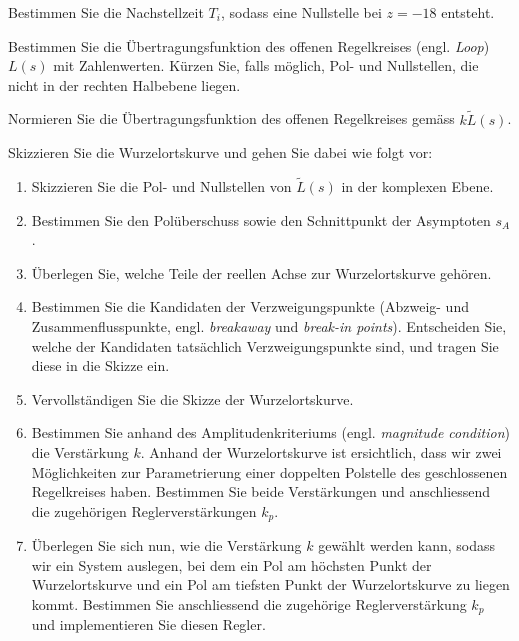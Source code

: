 \documentclass[a4paper,11pt]{scrartcl}
\begin{document}
\begin{aufgaben}
    \item Bestimmen Sie die Nachstellzeit $T_i$, sodass eine Nullstelle bei $z = -18$ entsteht.
    \item Bestimmen Sie die Übertragungsfunktion des offenen Regelkreises (engl. \emph{Loop}) $L(s)$ mit Zahlenwerten. Kürzen Sie, falls möglich, Pol- und Nullstellen, die nicht in der rechten Halbebene liegen.
    \item Normieren Sie die Übertragungsfunktion des offenen Regelkreises gemäss $k\tilde{L}(s)$.
    \item Skizzieren Sie die Wurzelortskurve und gehen Sie dabei wie folgt vor:
    \begin{enumerate}[label*=\alph*), leftmargin=2em]
        \item Skizzieren Sie die Pol- und Nullstellen von $\tilde{L}(s)$ in der komplexen Ebene.
        \item Bestimmen Sie den Polüberschuss sowie den Schnittpunkt der Asymptoten $s_A$.
        \item Überlegen Sie, welche Teile der reellen Achse zur Wurzelortskurve gehören.
        \item Bestimmen Sie die Kandidaten der Verzweigungspunkte (Abzweig- und Zusammenflusspunkte, engl. \emph{breakaway} und \emph{break-in points}). Entscheiden Sie, welche der Kandidaten tatsächlich Verzweigungspunkte sind, und tragen Sie diese in die Skizze ein.
        \item Vervollständigen Sie die Skizze der Wurzelortskurve.
        \item Bestimmen Sie anhand des Amplitudenkriteriums (engl. \emph{magnitude condition}) die Verstärkung $k$. Anhand der Wurzelortskurve ist ersichtlich, dass wir zwei Möglichkeiten zur Parametrierung einer doppelten Polstelle des geschlossenen Regelkreises haben. Bestimmen Sie beide Verstärkungen und anschliessend die zugehörigen Reglerverstärkungen $k_p$.
        \item Überlegen Sie sich nun, wie die Verstärkung $k$ gewählt werden kann, sodass wir ein System auslegen, bei dem ein Pol am höchsten Punkt der Wurzelortskurve und ein Pol am tiefsten Punkt der Wurzelortskurve zu liegen kommt. Bestimmen Sie anschliessend die zugehörige Reglerverstärkung $k_p$ und implementieren Sie diesen Regler.
    \end{enumerate}
\end{aufgaben}

\newpage
\begin{answerboxfillpage}\end{answerboxfillpage}
\end{document}
